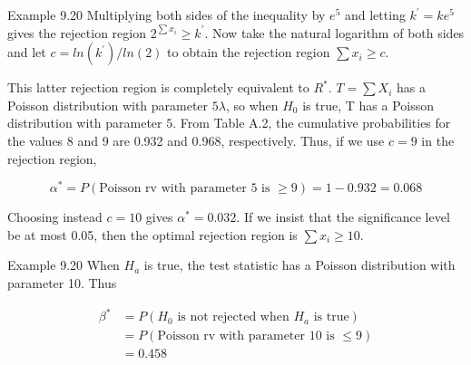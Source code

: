 \documentclass[
  ignorenonframetext,
]{beamer}
\begin{document}
\begin{frame}{Example 9.20}
\protect\hypertarget{example-9.20-1}{}
Multiplying both sides of the inequality by \(e^{5}\) and letting
\(k^{\prime} = ke^{5}\) gives the rejection region
\(2^{\sum x_{i}} \geq k^{\prime}\). Now take the natural logarithm of
both sides and let \(c = ln(k^{\prime})/ln(2)\) to obtain the rejection
region \(\sum x_{i} \geq c\).

This latter rejection region is completely equivalent to \(R^{*}\).
\(T = \sum X_{i}\) has a Poisson distribution with parameter
\(5\lambda\), so when \(H_{0}\) is true, T has a Poisson distribution
with parameter \(5\). From Table A.2, the cumulative probabilities for
the values 8 and 9 are 0.932 and 0.968, respectively. Thus, if we use
\(c = 9\) in the rejection region,

\[
\alpha^{*} = P(\text{Poisson rv with parameter 5 is } \geq 9) = 1 - 0.932 = 0.068
\]

Choosing instead \(c = 10\) gives \(\alpha^{*} = 0.032\). If we insist
that the significance level be at most 0.05, then the optimal rejection
region is \(\sum x_{i} \geq 10\).
\end{frame}

\begin{frame}{Example 9.20}
\protect\hypertarget{example-9.20-2}{}
When \(H_{a}\) is true, the test statistic has a Poisson distribution
with parameter 10. Thus

\[
\begin{aligned}
\beta^{*} &= P(H_{0} \text{ is not rejected when } H_{a} \text{ is true}) \\
&= P(\text{Poisson rv with parameter 10 is } \leq 9) \\
&= 0.458
\end{aligned}
\]
\end{frame}
\end{document}
